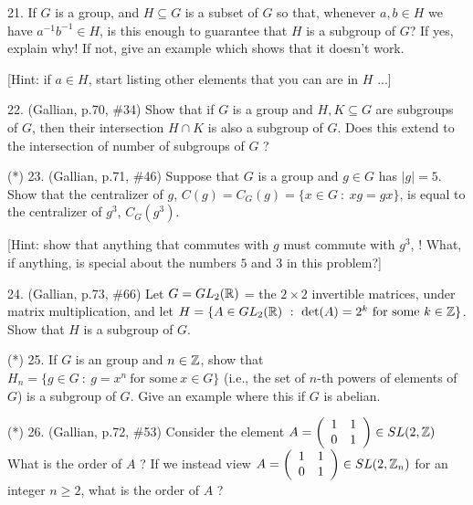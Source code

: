 \documentclass[12pt]{article}
\begin{document}
\begin{description}


\item{21.} If $G$ is a group,
and $H\subseteq G$ is a subset of $G$ so that, whenever
$a,b\in H$ we have $a^{-1}b^{-1}\in H$, is this enough
to guarantee that $H$ is a subgroup of $G$? If yes, 
explain why! If not, give an example which shows that
it doesn't work.

\msk

[Hint: if $a\in H$, start listing other elements that you can
 are in $H$ ...]

\msk

\item{22.} (Gallian, p.70, \#34) Show that if $G$ is a 
group and $H,K\subseteq G$ are subgroups of $G$, then 
their intersection $H\cap K$ is also a subgroup of $G$.
Does this extend to the intersection of 
number of subgroups of $G$ ?

\msk

\item{(*) 23.} (Gallian, p.71, \#46) Suppose that $G$ is a group
and $g\in G$ has $|g|=5$. Show that the centralizer of $g$,
$C(g)=C_G(g)=\{x\in G\ :\ xg=gx\}$, is equal to the
centralizer of $g^3$, $C_G(g^3)$.

\ssk

[Hint: show that anything that commutes with $g$ must commute 
with $g^3$,   ! What, if anything,
is special about the numbers $5$ and $3$ in this problem?]

\msk

\item{24.} (Gallian, p.73, \#66) Let $G = GL_2({\mathbb R})$ = the
$2\times 2$ invertible matrices, under matrix multiplication, and
let $H=\{A\in GL_2(\bbr)\ :\ \textrm{det}(A) = 2^k\ \textrm{for some}\ k\in\bbz\}$.
Show that $H$ is a subgroup of $G$.

\msk

\item{(*) 25.} If $G$ is an  group and $n\in{\mathbb Z}$, show that 
$H_n = \{g\in G\ :\ g=x^n\ \textrm{for some}\ x\in G\}$ (i.e., the set
of $n$-th powers of elements of $G$) is a subgroup
of $G$. Give an example where this  if $G$ is  abelian.
\msk

\item{(*) 26.} (Gallian, p.72, \#53) Consider the element 
$A = \left( \begin{array}{cc} 1 & 1 \\ 0 & 1 \end{array} \right)\in SL(2,{\mathbb Z})$
What is the order of $A$ ? If we instead view 
$A = \left( \begin{array}{cc} 1 & 1 \\ 0 & 1 \end{array} \right)\in SL(2,{\mathbb Z}_n)$
for an integer $n\geq 2$, what is the order of $A$ ?


\end{description}
\end{document}
